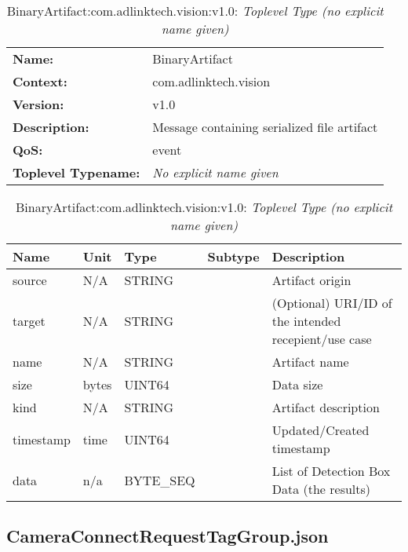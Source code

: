 \begin{table}[H]
\begin{tabularx}{\textwidth}{l X} 
       \textbf{Name:} & BinaryArtifact \\ 
	   \textbf{Context:} & com.adlinktech.vision \\ 
	   \textbf{Version:} & v1.0 \\ 
	   \textbf{Description:} & Message containing serialized file artifact \\ 
	   \textbf{QoS:} & event \\
	   \textbf{Toplevel Typename:} & \textit{No explicit name given} \\ 
\end{tabularx}
\caption{BinaryArtifact:com.adlinktech.vision:v1.0}\label{BinaryArtifactTagGroup.json:table:BinaryArtifact}
\bigskip
\begin{tabularx}{\textwidth}{l l l l X} 
	 \textbf{Name} & \textbf{Unit} & \textbf{Type} & \textbf{Subtype} & \textbf{Description} \\
	 \midrule
   source & N/A & STRING &  & Artifact origin \\
   target & N/A & STRING &  & (Optional) URI/ID of the intended recepient/use case \\
   name & N/A & STRING &  & Artifact name \\
   size & bytes & UINT64 &  & Data size \\
   kind & N/A & STRING &  & Artifact description \\
   timestamp & time & UINT64 &  & Updated/Created timestamp \\
   data & n/a & BYTE\_SEQ &  & List of Detection Box Data (the results) \\
\end{tabularx}
\caption{BinaryArtifact:com.adlinktech.vision:v1.0: \textit{Toplevel Type (no explicit name given)}}\label{BinaryArtifactTagGroup.json:table:BinaryArtifact-no-type-given}


\end{table}

\subsection{CameraConnectRequestTagGroup.json}

